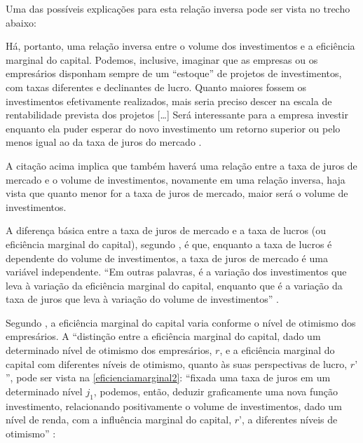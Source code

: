 \documentclass[
	10pt,				%
	openright,			%
	twoside,			%
	a5paper,			%
	english,			%
	french,				%
	spanish,			%
	brazil				%
	]{abntex2}
\renewenvironment{quote}
  {\small\list{}{\rightmargin=0.1cm \leftmargin=4cm}%
   \item\relax}
  {\endlist}
\begin{document}
Uma das possíveis explicações para esta relação inversa pode ser vista
no trecho abaixo:

\begin{quote}
Há, portanto, uma relação inversa entre o volume dos investimentos e a
eficiência marginal do capital. Podemos, inclusive, imaginar que as
empresas ou os empresários disponham sempre de um ``estoque'' de
projetos de investimentos, com taxas diferentes e declinantes de lucro.
Quanto maiores fossem os investimentos efetivamente realizados, mais
seria preciso descer na escala de rentabilidade prevista dos projetos
{[}\ldots{}{]} Será interessante para a empresa investir enquanto ela
puder esperar do novo investimento um retorno superior ou pelo menos
igual ao da taxa de juros do mercado \cite[p.~5]{Bresser-Pereira1973}.
\end{quote}

A citação acima implica que também haverá uma relação entre a taxa de
juros de mercado e o volume de investimentos, novamente em uma relação
inversa, haja vista que quanto menor for a taxa de juros de mercado,
maior será o volume de investimentos.

A diferença básica entre a taxa de juros de mercado e a taxa de lucros
(ou eficiência marginal do capital), segundo
, é que, enquanto a taxa de lucros
é dependente do volume de investimentos, a taxa de juros de mercado é
uma variável independente. ``Em outras palavras, é a variação dos
investimentos que leva à variação da eficiência marginal do capital,
enquanto que é a variação da taxa de juros que leva à variação do volume
de investimentos'' \cite[]{Bresser-Pereira1973}.

Segundo , a eficiência marginal do
capital varia conforme o nível de otimismo dos empresários. A
``distinção entre a eficiência marginal do capital, dado um determinado
nível de otimismo dos empresários, \(r\), e a eficiência marginal do
capital com diferentes níveis de otimismo, quanto às suas perspectivas
de lucro, \(r’\)'', pode ser vista na \autoref{eficienciamarginal2}:
``fixada uma taxa de juros em um determinado nível \(j_1\), podemos,
então, deduzir graficamente uma nova função investimento, relacionando
positivamente o volume de investimentos, dado um nível de renda, com a
influência marginal do capital, \(r’\), a diferentes níveis de
otimismo'' \cite[p.~8]{Bresser-Pereira1973}:
\end{document}
